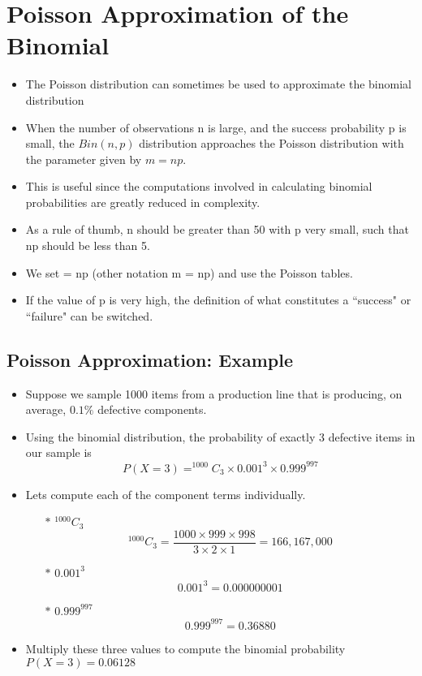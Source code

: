 




\section{Poisson Approximation of the Binomial}

\begin{itemize}
\item The Poisson distribution can sometimes be used to approximate the
binomial distribution
\item When the number of observations n is large, and the success probability
p is small, the $Bin(n,p)$ distribution approaches the Poisson distribution
with the parameter given by $m = np$.
\item This is useful since the computations involved in calculating binomial
probabilities are greatly reduced in complexity.
\item As a rule of thumb, n should be greater than 50 with p very small, such
that np should be less than 5.
\item We set = np (other notation m = np)  and use the Poisson tables.
\item If the value of p is very high, the definition of what constitutes a
``success" or ``failure" can be switched.
\end{itemize}


\subsection{Poisson Approximation: Example}

\begin{itemize}
\item Suppose we sample 1000 items from a production line that is producing, on
average, $0.1\%$ defective components.
\item Using the binomial distribution, the probability of exactly 3 defective items in
our sample is
\[P(X = 3) = ^{1000}C_{3} \times 0.001^{3} \times 0.999^{997}\]




\item Lets compute each of the component terms individually.

\begin{itemize}
\item[$\ast$] $^{1000}C_{3}$
\[^{1000}C_{3} = \frac{1000 \times 999 \times 998}{3 \times 2 \times 1} = 166,167,000\]
\item[$\ast$] $0.001^3$
\[0.001^3 = 0.000000001\]
\item[$\ast$] $0.999^{997}$
\[0.999^{997} = 0.36880\]
\end{itemize}


\item Multiply these three values to compute the binomial probability
$P(X = 3) = 0.06128$

\end{itemize}

